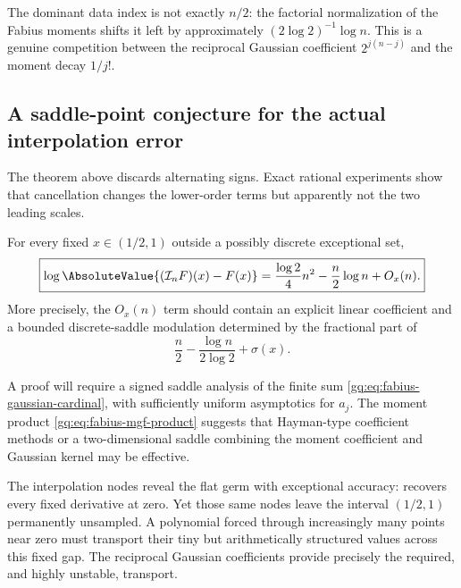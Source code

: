 The dominant data index is not exactly $n/2$: the factorial normalization of
the Fabius moments shifts it left by approximately
$(2\log2)^{-1}\log n$.  This is a genuine competition between the reciprocal
Gaussian coefficient $2^{j(n-j)}$ and the moment decay $1/j!$.

\subsection{A saddle-point conjecture for the actual interpolation error}

The theorem above discards alternating signs.  Exact rational experiments
show that cancellation changes the lower-order terms but apparently not the
two leading scales.

\begin{conjecture}
\label{gq:conj:fabius-gap-asymptotic}
For every fixed $x\in(1/2,1)$ outside a possibly discrete exceptional set,
\begin{equation}
 \boxed{
 \log\AbsoluteValue{(\Interp_nF)(x)-F(x)}
 =\frac{\log2}{4}n^2-\frac n2\log n+O_x(n).}
 \label{gq:eq:conj-fabius-gap-asymptotic}
\end{equation}
More precisely, the $O_x(n)$ term should contain an explicit linear
coefficient and a bounded discrete-saddle modulation determined by the
fractional part of
\begin{equation}
 \frac n2-\frac{\log n}{2\log2}+\sigma(x).
 \label{gq:eq:conj-fabius-saddle-phase}
\end{equation}
\end{conjecture}

A proof will require a signed saddle analysis of the finite sum
\eqref{gq:eq:fabius-gaussian-cardinal}, with sufficiently uniform asymptotics
for $a_j$.  The moment product \eqref{gq:eq:fabius-mgf-product} suggests that
Hayman-type coefficient methods or a two-dimensional saddle combining the
moment coefficient and Gaussian kernel may be effective.

\begin{remark}
The interpolation nodes reveal the flat germ with exceptional accuracy:
 recovers every fixed derivative at zero.  Yet
those same nodes leave the interval $(1/2,1)$ permanently unsampled.  A
polynomial forced through increasingly many points near zero must transport
their tiny but arithmetically structured values across this fixed gap.  The
reciprocal Gaussian coefficients provide precisely the required, and highly
unstable, transport.
\end{remark}

